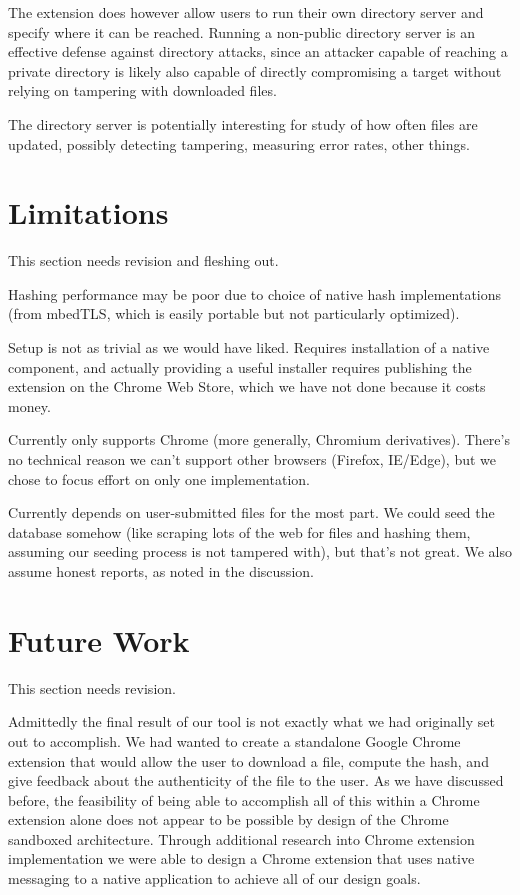\documentclass[letterpaper,twocolumn,10pt]{article}
\begin{document}
The extension does however allow users to run their own directory server and specify where it can be reached. Running a non-public directory server is an effective defense against directory attacks, since an attacker capable of reaching a private directory is likely also capable of directly compromising a target without relying on tampering with downloaded files.

The directory server is potentially interesting for study of how often files are updated, possibly detecting tampering, measuring error rates, other things.

\section{Limitations}

This section needs revision and fleshing out.

Hashing performance may be poor due to choice of native hash implementations (from mbedTLS, which is easily portable but not particularly optimized).

Setup is not as trivial as we would have liked. Requires installation of a native component, and actually providing a useful installer requires publishing the extension on the Chrome Web Store, which we have not done because it costs money.

Currently only supports Chrome (more generally, Chromium derivatives). There’s no technical reason we can’t support other browsers (Firefox, IE/Edge), but we chose to focus effort on only one implementation.

Currently depends on  user-submitted files for the most part. We could seed the database somehow (like scraping lots of the web for files and hashing them, assuming our seeding process is not tampered with), but that’s not great. We also assume honest reports, as noted in the discussion.

\section{Future Work}

This section needs revision.

Admittedly the final result of our tool is not exactly what we had originally set out to accomplish. We had wanted to create a standalone Google Chrome extension that would allow the user to download a file, compute the hash, and give feedback about the authenticity of the file to the user. As we have discussed before, the feasibility of being able to accomplish all of this within a Chrome extension alone does not appear to be possible by design of the Chrome sandboxed architecture. Through additional research into Chrome extension implementation we were able to design a Chrome extension that uses native messaging to a native application to achieve all of our design goals.

{\footnotesize 
}
\end{document}
